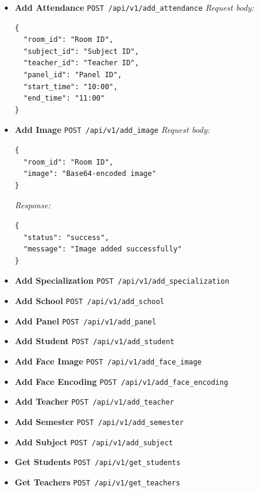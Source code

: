 \documentclass[openany]{report}
\begin{document}
\begin{itemize}
  \item \textbf{Add Attendance}  
    \texttt{POST /api/v1/add\_attendance}  
    \textit{Request body:}
    \begin{verbatim}
{
  "room_id": "Room ID",
  "subject_id": "Subject ID",
  "teacher_id": "Teacher ID",
  "panel_id": "Panel ID",
  "start_time": "10:00",
  "end_time": "11:00"
}
    \end{verbatim}

  \item \textbf{Add Image}  
    \texttt{POST /api/v1/add\_image}  
    \textit{Request body:}
    \begin{verbatim}
{
  "room_id": "Room ID",
  "image": "Base64-encoded image"
}
    \end{verbatim}
    \textit{Response:}
    \begin{verbatim}
{
  "status": "success",
  "message": "Image added successfully"
}
    \end{verbatim}

  \item \textbf{Add Specialization}  
    \texttt{POST /api/v1/add\_specialization}

  \item \textbf{Add School}  
    \texttt{POST /api/v1/add\_school}

  \item \textbf{Add Panel}  
    \texttt{POST /api/v1/add\_panel}

  \item \textbf{Add Student}  
    \texttt{POST /api/v1/add\_student}

  \item \textbf{Add Face Image}  
    \texttt{POST /api/v1/add\_face\_image}

  \item \textbf{Add Face Encoding}  
    \texttt{POST /api/v1/add\_face\_encoding}

  \item \textbf{Add Teacher}  
    \texttt{POST /api/v1/add\_teacher}

  \item \textbf{Add Semester}  
    \texttt{POST /api/v1/add\_semester}

  \item \textbf{Add Subject}  
    \texttt{POST /api/v1/add\_subject}

  \item \textbf{Get Students}  
    \texttt{POST /api/v1/get\_students}

  \item \textbf{Get Teachers}  
    \texttt{POST /api/v1/get\_teachers}
\end{itemize}
\end{document}
